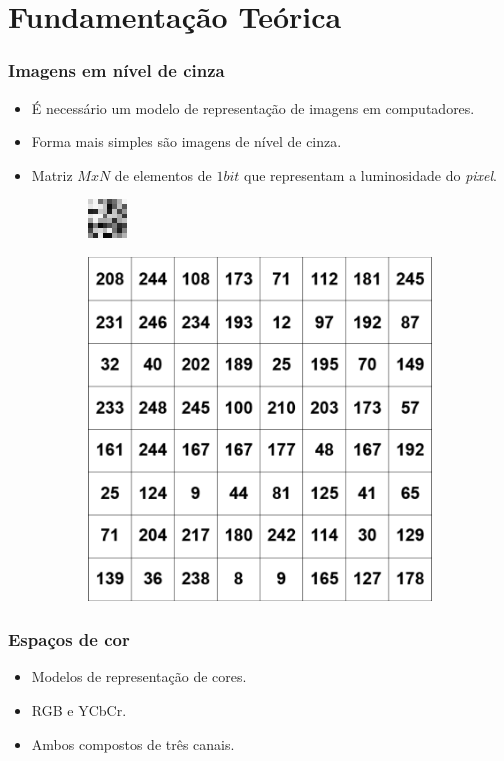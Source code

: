 \documentclass{beamer}
\begin{document}
\section{Fundamentação Teórica}
\begin{frame}
\frametitle{Imagens em nível de cinza}
\begin{itemize}
  \item É necessário um modelo de representação de imagens em computadores.
  \item Forma mais simples são imagens de nível de cinza.
  \item Matriz $MxN$ de elementos de $1 bit$ que representam a luminosidade do \textit{pixel}.
\end{itemize}

\begin{figure}
 \centering
 \begin{subfigure}{.5\textwidth}
  \centering
  \includegraphics[width=.5\linewidth]{ExemploNivelCinza}
  \caption{}
  \label{exemplo:sfig2}
\end{subfigure}%
\begin{subfigure}{.5\textwidth}
  \centering
  \includegraphics[width=.5\linewidth]{MatrizNivelCinza}
  \caption{}
  \label{exemplo:sfig1}
\end{subfigure}%
\end{figure}


\end{frame}
\begin{frame}
\frametitle{Espaços de cor}
\begin{itemize}
  \item Modelos de representação de cores.
  \item RGB e YCbCr.
  \item Ambos compostos de três canais.
\end{itemize}
\end{frame}
\end{document}
